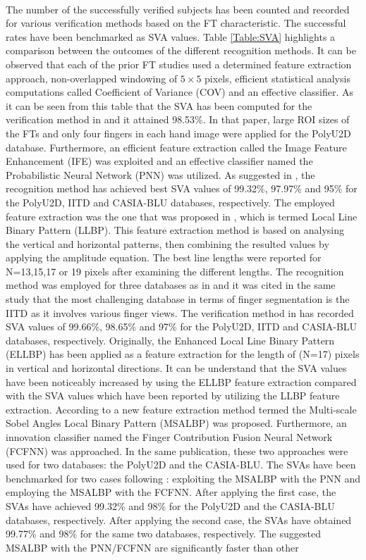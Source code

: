 \documentclass[conference]{IEEEtran}
\begin{document}
\\
The number of the successfully verified subjects has been counted and recorded for various verification methods based on the FT characteristic. The successful rates have been benchmarked as SVA values. Table \ref{Table:SVA} highlights a comparison between the outcomes of the different recognition methods. It can be observed that each of the prior FT studies used a determined feature extraction approach, non-overlapped windowing of $5 \times 5$ pixels, efficient statistical analysis computations called Coefficient of Variance (COV) and an effective classifier. As it can be seen from this table that the SVA  has been computed for the verification method in \cite{Al-Nima2015Human} and it attained 98.53\%. In that paper, large ROI sizes of the FTs and only four fingers in each hand image were applied for the PolyU2D database. Furthermore, an efficient feature extraction called the Image Feature Enhancement (IFE) was exploited and an effective classifier named the Probabilistic Neural Network (PNN) was utilized. As suggested in \cite{Al-Nima2017efficient}, the recognition method has achieved best SVA values of 99.32\%, 97.97\% and 95\% for the PolyU2D, IITD and CASIA-BLU databases, respectively. The employed feature extraction was the one that was proposed in \cite{Petpon2009Face}, which is termed Local Line Binary Pattern (LLBP). This feature extraction method is based on analysing the vertical and horizontal patterns, then combining the resulted values by applying the amplitude equation. The best line lengths were reported for N=13,15,17 or 19 pixels after examining the different lengths. The recognition method was employed for three databases as in \cite{Al-Nima2017efficient} and it was cited in the same study that the most challenging database in terms of finger segmentation is the IITD as it involves various finger views. The verification method in \cite{Al-Nima2017Robust} has recorded SVA values of 99.66\%, 98.65\% and 97\% for the PolyU2D, IITD and CASIA-BLU databases, respectively. Originally, the Enhanced Local Line Binary Pattern (ELLBP) has been applied as a feature extraction for the length of (N=17) pixels in vertical and horizontal directions. It can be understand that the SVA values have been noticeably increased by using the ELLBP feature extraction compared with the SVA values which have been reported by utilizing the LLBP feature extraction. According to \cite{Al-Nima2017finger} a new feature extraction method termed the Multi-scale Sobel Angles Local Binary Pattern (MSALBP) was proposed. Furthermore, an innovation classifier named the Finger Contribution Fusion Neural Network (FCFNN) was approached. In the same publication, these two approaches were used for two databases: the PolyU2D and the CASIA-BLU. The SVAs have been benchmarked for two cases following \cite{Al-Nima2017finger}: exploiting the MSALBP with the PNN and employing the MSALBP with the FCFNN. After applying the first case, the SVAs have achieved 99.32\% and 98\% for the PolyU2D and the CASIA-BLU databases, respectively. After applying the second case, the SVAs have obtained 99.77\% and 98\% for the same two databases, respectively. The suggested MSALBP with the PNN/FCFNN are significantly faster than other 
\end{document}

